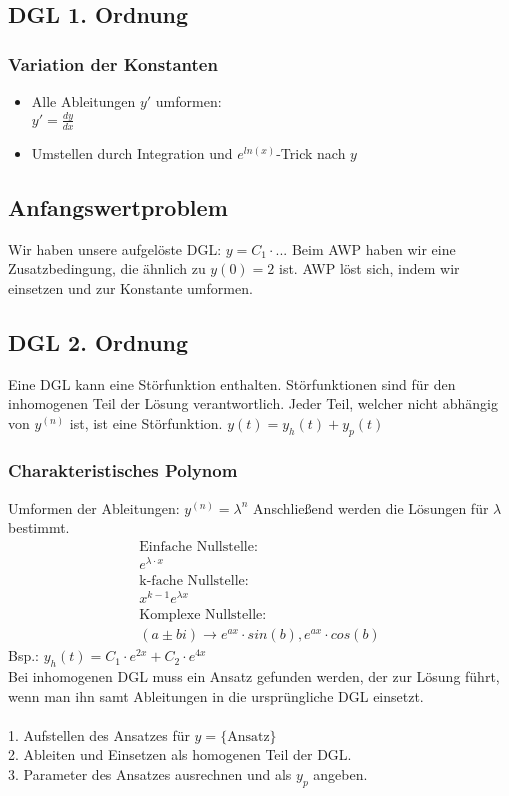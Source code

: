 \documentclass[a4paper, landscape, 10pt]{article}
\begin{document}
\begin{multicols}{4}
\begin{small}
		\subsection{DGL 1. Ordnung}	
			\subsubsection{Variation der Konstanten}
				\begin{itemize}
					\item Alle Ableitungen $y'$ umformen: \\
						  $y' = \frac{dy}{dx}$
					\item Umstellen durch Integration und $e^{ln(x)}$-Trick nach $y$
				\end{itemize}
			\subsection{Anfangswertproblem}
				Wir haben unsere aufgelöste DGL: $y = C_1 \cdot ...$
				Beim AWP haben wir eine Zusatzbedingung, die ähnlich zu $y(0) = 2$ ist. AWP löst sich, indem wir einsetzen und zur Konstante umformen.
		\subsection{DGL 2. Ordnung}	
			Eine DGL kann eine Störfunktion enthalten. Störfunktionen sind für den inhomogenen Teil der Lösung verantwortlich. Jeder Teil, welcher nicht abhängig von $y^{(n)}$ ist, ist eine Störfunktion. $y(t) = y_h(t) + y_p(t)$
			\subsubsection{Charakteristisches Polynom}
				Umformen der Ableitungen: $y^{(n)} = \lambda^n$
				Anschließend werden die Lösungen für $\lambda$ bestimmt.
				\begin{align*}
					\text{Einfache Nullstelle:}\\
					e^{\lambda \cdot x}\\
					\text{k-fache Nullstelle:}\\
					x^{k-1} e^{\lambda x}\\
					\text{Komplexe Nullstelle:}\\
					(a \pm bi) \rightarrow e^{ax} \cdot sin(b), e^{ax} \cdot cos(b)
				\end{align*}
				Bsp.: $y_h(t) = C_1 \cdot e^{2x} + C_2 \cdot e^{4x}$\\
				Bei inhomogenen DGL muss ein Ansatz gefunden werden, der zur Lösung führt, wenn man ihn samt Ableitungen in die ursprüngliche DGL einsetzt.\\
				\\
				1. Aufstellen des Ansatzes für $y = \{ \text{Ansatz} \}$\\
				2. Ableiten und Einsetzen als homogenen Teil der DGL.\\
				3. Parameter des Ansatzes ausrechnen und als $y_p$ angeben.
\end{small}
\end{multicols}
\end{document}
